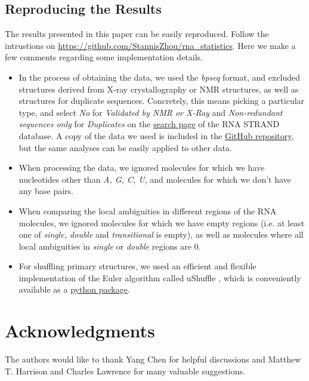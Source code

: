 \documentclass[10pt,letterpaper]{article}
\begin{document}
\subsection*{Reproducing the Results}
The results presented in this paper can be easily reproduced. Follow the intrustions on \url{https://github.com/StannisZhou/rna_statistics}. Here we make a few comments regarding some implementation details.
\begin{itemize}
	\item In the process of obtaining the data, we used the \textit{bpseq} format, and excluded structures derived from X-ray crystallography or NMR structures, as well as structures for duplicate sequences. Concretely, this means picking a particular type, and select \textit{No} for \textit{Validated by NMR or X-Ray} and \textit{Non-redundant sequences only} for \textit{Duplicates} on the \href{http://www.rnasoft.ca/strand/search.php}{search page} of the RNA STRAND database. A copy of the data we used is included in the \href{https://github.com/StannisZhou/rna_statistics/tree/master/data}{GitHub repository}, but the same analyses can be easily  applied to other data.
	\item When processing the data, we ignored molecules for which we have nucleotides other than \textit{A, G, C, U}, and molecules for which we don't have any base pairs.
	\item When comparing the local ambiguities in different regions of the RNA molecules, we ignored molecules for which we have empty regions (i.e. at least one of \textit{single, double} and \textit{transitional} is empty), as well as molecules where all local ambiguities in \textit{single} or \textit{double} regions are 0.
	\item For shuffling primary structures, we used an efficient and flexible implementation of the Euler algorithm\cite{Kandel1996-kz, Fitch1983-ec, Altschul1985-nq} called uShuffle \cite{Jiang2008-yj}, which is conveniently available as a \href{https://github.com/guma44/ushuffle}{python package}.
\end{itemize}

\section*{Acknowledgments}
The authors would like to thank Yang Chen for helpful discussions and Matthew T. Harrison and Charles Lawrence for many valuable suggestions.

\nolinenumbers


\end{document}
